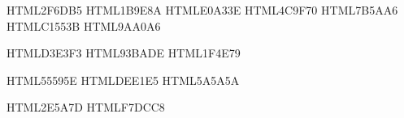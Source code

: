 
\pgfplotsset{compat=1.18}

\definecolor{jsBlue}  {HTML}{2F6DB5}
\definecolor{jsTeal}  {HTML}{1B9E8A}
\definecolor{jsAmber} {HTML}{E0A33E}
\definecolor{jsGreen} {HTML}{4C9F70}
\definecolor{jsPlum}  {HTML}{7B5AA6}
\definecolor{jsRust}  {HTML}{C1553B}
\definecolor{jsGrey}  {HTML}{9AA0A6}

\definecolor{jsSeqI}  {HTML}{D3E3F3}
\definecolor{jsSeqII} {HTML}{93BADE}
\definecolor{jsSeqIV} {HTML}{1F4E79}

\definecolor{jsAxis}  {HTML}{55595E}
\definecolor{jsGrid}  {HTML}{DEE1E5}
\definecolor{jsRule}  {HTML}{5A5A5A}

\definecolor{pBand}     {HTML}{2E5A7D}
\definecolor{pDbHead}   {HTML}{F7DCC8}

